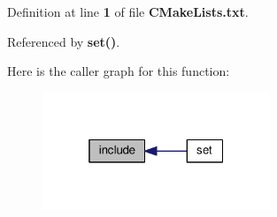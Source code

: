 Definition at line {\bf 1} of file {\bf C\+Make\+Lists.\+txt}.



Referenced by {\bf set()}.



Here is the caller graph for this function\+:
\nopagebreak
\begin{figure}[H]
\begin{center}
\leavevmode
\includegraphics[width=193pt]{d2/ddf/src_2utilities_2CMakeLists_8txt_a3b0122961b0fde3a0160d84d2644b625_icgraph}
\end{center}
\end{figure}


